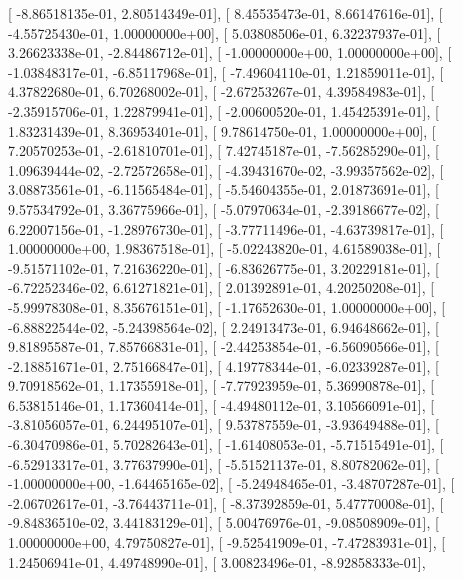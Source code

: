 \documentclass{article}
\begin{document}
       [ -8.86518135e-01,   2.80514349e-01],
       [  8.45535473e-01,   8.66147616e-01],
       [ -4.55725430e-01,   1.00000000e+00],
       [  5.03808506e-01,   6.32237937e-01],
       [  3.26623338e-01,  -2.84486712e-01],
       [ -1.00000000e+00,   1.00000000e+00],
       [ -1.03848317e-01,  -6.85117968e-01],
       [ -7.49604110e-01,   1.21859011e-01],
       [  4.37822680e-01,   6.70268002e-01],
       [ -2.67253267e-01,   4.39584983e-01],
       [ -2.35915706e-01,   1.22879941e-01],
       [ -2.00600520e-01,   1.45425391e-01],
       [  1.83231439e-01,   8.36953401e-01],
       [  9.78614750e-01,   1.00000000e+00],
       [  7.20570253e-01,  -2.61810701e-01],
       [  7.42745187e-01,  -7.56285290e-01],
       [  1.09639444e-02,  -2.72572658e-01],
       [ -4.39431670e-02,  -3.99357562e-02],
       [  3.08873561e-01,  -6.11565484e-01],
       [ -5.54604355e-01,   2.01873691e-01],
       [  9.57534792e-01,   3.36775966e-01],
       [ -5.07970634e-01,  -2.39186677e-02],
       [  6.22007156e-01,  -1.28976730e-01],
       [ -3.77711496e-01,  -4.63739817e-01],
       [  1.00000000e+00,   1.98367518e-01],
       [ -5.02243820e-01,   4.61589038e-01],
       [ -9.51571102e-01,   7.21636220e-01],
       [ -6.83626775e-01,   3.20229181e-01],
       [ -6.72252346e-02,   6.61271821e-01],
       [  2.01392891e-01,   4.20250208e-01],
       [ -5.99978308e-01,   8.35676151e-01],
       [ -1.17652630e-01,   1.00000000e+00],
       [ -6.88822544e-02,  -5.24398564e-02],
       [  2.24913473e-01,   6.94648662e-01],
       [  9.81895587e-01,   7.85766831e-01],
       [ -2.44253854e-01,  -6.56090566e-01],
       [ -2.18851671e-01,   2.75166847e-01],
       [  4.19778344e-01,  -6.02339287e-01],
       [  9.70918562e-01,   1.17355918e-01],
       [ -7.77923959e-01,   5.36990878e-01],
       [  6.53815146e-01,   1.17360414e-01],
       [ -4.49480112e-01,   3.10566091e-01],
       [ -3.81056057e-01,   6.24495107e-01],
       [  9.53787559e-01,  -3.93649488e-01],
       [ -6.30470986e-01,   5.70282643e-01],
       [ -1.61408053e-01,  -5.71515491e-01],
       [ -6.52913317e-01,   3.77637990e-01],
       [ -5.51521137e-01,   8.80782062e-01],
       [ -1.00000000e+00,  -1.64465165e-02],
       [ -5.24948465e-01,  -3.48707287e-01],
       [ -2.06702617e-01,  -3.76443711e-01],
       [ -8.37392859e-01,   5.47770008e-01],
       [ -9.84836510e-02,   3.44183129e-01],
       [  5.00476976e-01,  -9.08508909e-01],
       [  1.00000000e+00,   4.79750827e-01],
       [ -9.52541909e-01,  -7.47283931e-01],
       [  1.24506941e-01,   4.49748990e-01],
       [  3.00823496e-01,  -8.92858333e-01],
\end{document}
